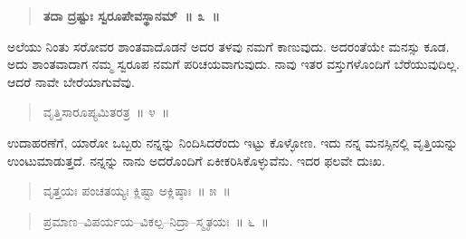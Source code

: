 \vspace{-0.2cm}

\begin{verse}
\textbf{ತದಾ ದ್ರಷ್ಟುಃ ಸ್ವರೂಪೇವಸ್ಥಾನಮ್​~॥ ೩~॥}
\end{verse}

\vspace{-0.3cm}


\vspace{0.1cm}

ಅಲೆಯು ನಿಂತು ಸರೋವರ ಶಾಂತವಾದೊಡನೆ ಅದರ ತಳವು ನಮಗೆ ಕಾಣುವುದು. ಅದರಂತೆಯೇ ಮನಸ್ಸು ಕೂಡ. ಅದು ಶಾಂತವಾದಾಗ ನಮ್ಮ ಸ್ವರೂಪ ನಮಗೆ ಪರಿಚಯವಾಗುವುದು. ನಾವು ಇತರ ವಸ್ತುಗಳೊಂದಿಗೆ ಬೆರೆಯುವುದಿಲ್ಲ. ಆದರೆ ನಾವೇ ಬೇರೆಯಾಗುವೆವು. 

\vspace{-0.2cm}

\begin{verse}
ವೃತ್ತಿಸಾರೂಪ್ಯಮಿತರತ್ರ~॥ ೪~॥
\end{verse}

\vspace{-0.3cm}


\vspace{0.1cm}

ಉದಾಹರಣೆಗೆ, ಯಾರೋ ಒಬ್ಬರು ನನ್ನನ್ನು ನಿಂದಿಸಿದರೆಂದು ಇಟ್ಟು ಕೊಳ್ಳೋಣ. ಇದು ನನ್ನ ಮನಸ್ಸಿನಲ್ಲಿ ವೃತ್ತಿಯನ್ನು ಉಂಟುಮಾಡುತ್ತದೆ. ನನ್ನನ್ನು ನಾನು ಅದರೊಂದಿಗೆ ಏಕೀಕರಿಸಿಕೊಳ್ಳುವೆನು. ಇದರ ಫಲವೇ ದುಃಖ. 

\vspace{-0.2cm}

\begin{verse}
ವೃತ್ತಯಃ ಪಂಚತಯ್ಯಃ ಕ್ಲಿಷ್ಟಾ ಅಕ್ಲಿಷ್ಠಾಃ~॥ ೫~॥
\end{verse}

\vspace{-0.3cm}


\vspace{-0.1cm}

\begin{verse}
ಪ್ರಮಾಣ–ವಿಪರ್ಯಯ–ವಿಕಲ್ಪ–ನಿದ್ರಾ–ಸ್ಮೃತಯಃ~॥ ೬~॥
\end{verse}

\vspace{-0.3cm}


